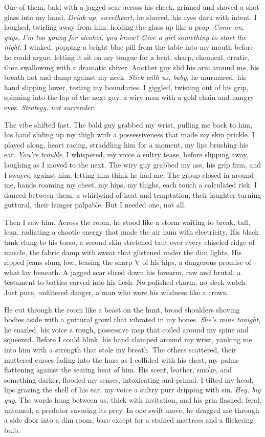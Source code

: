 \documentclass[12pt,oneside]{book}
\begin{document}
One of them, bald with a jagged scar across his cheek, grinned and shoved a shot glass into my hand. \textit{Drink up, sweetheart}, he slurred, his eyes dark with intent. I laughed, twirling away from him, holding the glass up like a prop. \textit{Come on, guys, I’m too young for alcohol, you know? Give a girl something to start the night}. I winked, popping a bright blue pill from the table into my mouth before he could argue, letting it sit on my tongue for a beat, sharp, chemical, erratic, then swallowing with a dramatic shiver. Another guy slid his arm around me, his breath hot and damp against my neck. \textit{Stick with us, baby,} he murmured, his hand slipping lower, testing my boundaries. I giggled, twisting out of his grip, spinning into the lap of the next guy, a wiry man with a gold chain and hungry eyes. \textit{Strategy, not surrender.}

The vibe shifted fast. The bald guy grabbed my wrist, pulling me back to him, his hand sliding up my thigh with a possessiveness that made my skin prickle. I played along, heart racing, straddling him for a moment, my lips brushing his ear. \textit{You’re trouble}, I whispered, my voice a sultry tease, before slipping away, laughing as I moved to the next. The wiry guy grabbed my ass, his grip firm, and I swayed against him, letting him think he had me. The group closed in around me, hands roaming my chest, my hips, my thighs, each touch a calculated risk. I danced between them, a whirlwind of heat and temptation, their laughter turning guttural, their hunger palpable. But I needed one, not all.

Then I saw him. Across the room, he stood like a storm waiting to break, tall, lean, radiating a chaotic energy that made the air hum with electricity. His black tank clung to his torso, a second skin stretched taut over every chiseled ridge of muscle, the fabric damp with sweat that glistened under the dim lights. His ripped jeans slung low, teasing the sharp V of his hips, a dangerous promise of what lay beneath. A jagged scar sliced down his forearm, raw and brutal, a testament to battles carved into his flesh. No polished charm, no sleek watch. Just pure, unfiltered danger, a man who wore his wildness like a crown.

He cut through the room like a beast on the hunt, broad shoulders shoving bodies aside with a guttural growl that vibrated in my bones. \textit{She’s mine tonight}, he snarled, his voice a rough, possessive rasp that coiled around my spine and squeezed. Before I could blink, his hand clamped around my wrist, yanking me into him with a strength that stole my breath. The others scattered, their muttered curses fading into the haze as I collided with his chest, my palms flattening against the searing heat of him. His scent, leather, smoke, and something darker, flooded my senses, intoxicating and primal. I tilted my head, lips grazing the shell of his ear, my voice a sultry purr dripping with sin. \textit{Hey, big guy}. The words hung between us, thick with invitation, and his grin flashed, feral, untamed, a predator savoring its prey. In one swift move, he dragged me through a side door into a dim room, bare except for a stained mattress and a flickering bulb.
\end{document}
